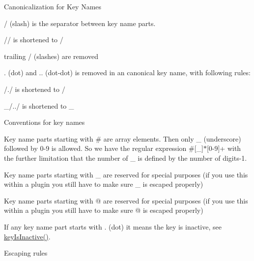 \begin{DoxyItemize}
\begin{DoxyParagraph}{Canonicalization for Key Names}
\begin{DoxyItemize}
\item / (slash) is the separator between key name parts.
\item // is shortened to /
\item trailing / (slashes) are removed
\item . (dot) and .. (dot-\/dot) is removed in an canonical key name, with following rules\+:
\begin{DoxyItemize}
\item /./ is shortened to /
\item \+\_\+/../ is shortened to \+\_\+
\end{DoxyItemize}
\end{DoxyItemize}
\end{DoxyParagraph}
\begin{DoxyParagraph}{Conventions for key names}

\begin{DoxyItemize}
\item Key name parts starting with \# are array elements. Then only \+\_\+ (underscore) followed by 0-\/9 is allowed. So we have the regular expression \#\mbox{[}\+\_\+\mbox{]}$\ast$\mbox{[}0-\/9\mbox{]}+ with the further limitation that the number of \+\_\+ is defined by the number of digits-\/1.
\item Key name parts starting with \+\_\+ are reserved for special purposes (if you use this within a plugin you still have to make sure \+\_\+ is escaped properly)
\item Key name parts starting with @ are reserved for special purposes (if you use this within a plugin you still have to make sure @ is escaped properly)
\item If any key name part starts with . (dot) it means the key is inactive, see \mbox{\hyperlink{group__keytest_gaa25f699f592031c1a0abc1504d14e13e}{key\+Is\+Inactive()}}.
\end{DoxyItemize}
\end{DoxyParagraph}
\begin{DoxyParagraph}{Escaping rules}


\end{DoxyParagraph}
\end{DoxyItemize}
